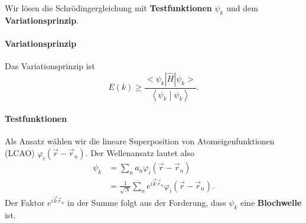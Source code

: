 \setcounter{section}{8}
\setcounter{subsection}{2}
\setcounter{equation}{13}

	Wir lösen die Schrödingergleichung mit \textbf{Testfunktionen} $\psi_{k}$ und dem \textbf{Variationsprinzip}. 

\paragraph{Variationsprinzip}
	Das Variationsprinzip ist
	$$
	E(k) \ge \frac{\big<\psi_{k}  | \hat{H}  | \psi_{k} \big>}{\left<\psi_{k}  \middle| \psi_{k} \right>}.
	$$

\paragraph{Testfunktionen}
	Als Ansatz wählen wir die lineare Superposition von Atomeigenfunktionen (LCAO) $\varphi_{i} (\Vec{r}-\Vec{r}_{n})$.
	Der Wellenansatz lautet also
	$$
	\begin{aligned}
		\psi_{k} &= \sum_{n}^{} a_{n} \varphi_{i} (\Vec{r}-\Vec{r}_{n})\\
		&= \frac{1}{\sqrt{N} } \sum_{n}^{} e^{i\Vec{k}\Vec{r}_{n}} \varphi_{i} (\Vec{r}-\Vec{r}_{n}).
	\end{aligned}
	$$
	Der Faktor $e^{i\Vec{k}\Vec{r}_{n}}$ in der Summe folgt aus der Forderung, dass $\psi_{k}$ eine \textbf{Blochwelle} ist.
	
